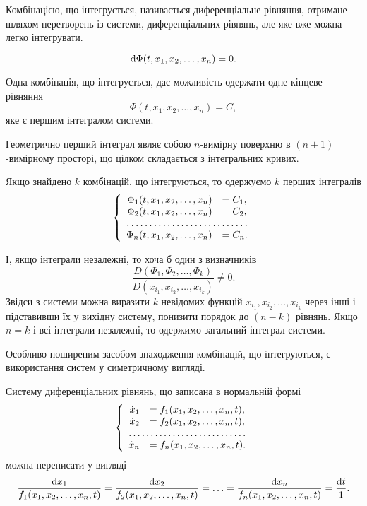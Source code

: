 \begin{definition}
	Комбінацією, що інтегрується, називається диференціальне рівняння, отримане шляхом перетворень із системи, диференціальних рівнянь, але яке вже можна легко інтегрувати.
\end{definition}
\begin{equation*}
	\mathop{}\!\mathrm{d} \Phi(t, x_1, x_2, \ldots, x_n) = 0.
\end{equation*}

Одна комбінація, що інтегрується, дає можливість одержати одне кінцеве рівняння
\begin{equation*}
	\Phi(t, x_1, x_2, \ldots, x_n) = C,
\end{equation*}
яке є першим інтегралом системи. \parvskip

Геометрично перший інтеграл являє собою $n$-вимірну поверхню в $(n + 1)$-вимірному просторі, що цілком складається з інтегральних кривих. \parvskip

Якщо знайдено $k$ комбінацій, що інтегруються, то одержуємо $k$ перших інтегралів
\begin{equation*}
	\left\{
		\begin{array}{rl}
			\Phi_1(t, x_1, x_2, \ldots, x_n) &= C_1, \\
			\Phi_2(t, x_1, x_2, \ldots, x_n) &= C_2, \\
			\hdotsfor{2} \\
			\Phi_n(t, x_1, x_2, \ldots, x_n) &= C_n.
		\end{array}
	\right.
\end{equation*}
 
І, якщо інтеграли незалежні, то хоча б один з визначників \[\frac{D(\Phi_1, \Phi_2, \ldots, \Phi_k)}{D(x_{i_1}, x_{i_2}, \ldots, x_{i_k})} \ne 0.\] Звідси з системи можна виразити $k$ невідомих функцій $x_{i_1}, x_{i_2}, \ldots, x_{i_k}$ через інші і підставивши їх у вихідну систему, понизити порядок до $(n - k)$ рівнянь. Якщо $n = k$ і всі інтеграли незалежні, то одержимо загальний інтеграл системи. \parvskip

Особливо поширеним засобом знаходження комбінацій, що інтегруються, є використання систем у симетричному вигляді. \parvskip

Систему диференціальних рівнянь, що записана в нормальній формі
\begin{equation*}
	\left\{
		\begin{array}{rl}
			\dot x_1 &= f_1 (x_1, x_2, \ldots, x_n, t), \\
			\dot x_2 &= f_2 (x_1, x_2, \ldots, x_n, t), \\
			\hdotsfor{2} \\
			\dot x_n &= f_n (x_1, x_2, \ldots, x_n, t).
		\end{array}
	\right.
\end{equation*}
можна переписати у вигляді
\begin{equation*}
	\frac{\mathop{}\!\mathrm{d} x_1}{f_1(x_1, x_2, \ldots, x_n, t)} = \frac{\mathop{}\!\mathrm{d} x_2}{f_2 (x_1, x_2, \ldots, x_n, t)} = \ldots = \frac{\mathop{}\!\mathrm{d} x_n}{f_n (x_1, x_2, \ldots, x_n, t)} = \frac{\mathop{}\!\mathrm{d} t}{1}.
\end{equation*}

